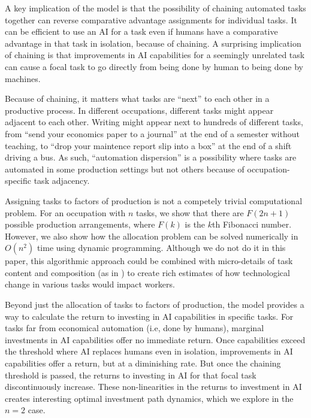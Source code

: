 \documentclass{article}
\theoremstyle{plain}
\theoremstyle{plain}
\begin{document}
A key implication of the model is that the possibility of chaining automated tasks together can reverse comparative advantage assignments for individual tasks. 
It can be efficient to use an AI for a task even if humans have a comparative advantage in that task in isolation, because of chaining.
A surprising implication of chaining is that improvements in AI capabilities for a seemingly unrelated task can cause a focal task to go directly from being done by human to being done by machines.

Because of chaining, it matters what tasks are ``next'' to each other in a productive process.
In different occupations, different tasks might appear adjacent to each other. 
Writing might appear next to hundreds of different tasks, from ``send your economics paper to a journal'' at the end of a semester without teaching, to ``drop your maintence report slip into a box'' at the end of a shift driving a bus.
As such, ``automation dispersion'' is a possibility where tasks are automated in some production settings but not others because of occupation-specific task adjacency.

Assigning tasks to factors of production is not a competely trivial computational problem.
For an occupation with $n$ tasks, we show that there are $F(2n + 1)$ possible production arrangements, where $F(k)$ is the $k$th Fibonacci number.
However, we also show how the allocation problem can be solved numerically in $O(n^2)$ time using dynamic programming.
Although we do not do it in this paper, this algorithmic approach could be combined with micro-details of task content and composition (as in \cite{frey2017future, felten2021occupational, eloundou2023gpts}) to create rich estimates of how technological change in various tasks would impact workers. 

Beyond just the allocation of tasks to factors of production, the model provides a way to calculate the return to investing in AI capabilities in specific tasks.
For tasks far from economical automation (i.e, done by humans), marginal investments in AI capabilities offer no immediate return.
Once capabilities exceed the threshold where AI replaces humans even in isolation, improvements in AI capabilities offer a return, but at a diminishing rate.
But once the chaining threshold is passed, the returns to investing in AI for that focal task discontinuously increase.
These non-linearities in the returns to investment in AI creates interesting optimal investment path dynamics, which we explore in the $n = 2$ case.
\end{document}
